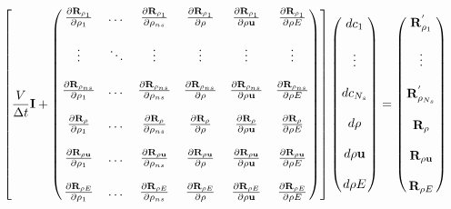 \documentclass[a4paper]{report}
\begin{document}
\begin{equation}
  \left[ 
    \frac{V}{\Delta t} \mi + 
    \begin{pmatrix}
      \tdiff{\rho_1}{\rho_1}    & \dots  & \tdiff{\rho_{ns}}{\rho_1}    & \tdiff{\rho}{\rho_1}    & \tdiff{\rho \vu}{\rho_1}    & \tdiff{\rho E}{\rho_1} \\ \\
      \vdots                    & \ddots & \vdots                       & \vdots                  & \vdots                      & \vdots                   \\ \\
      \tdiff{\rho_1}{\rho_{ns}} & \dots  & \tdiff{\rho_{ns}}{\rho_{ns}} & \tdiff{\rho}{\rho_{ns}} & \tdiff{\rho \vu}{\rho_{ns}} & \tdiff{\rho E}{\rho_{ns}} \\ \\
      \tdiff{\rho_1}{\rho}      & \dots  & \tdiff{\rho_{ns}}{\rho}      & \tdiff{\rho}{\rho}      & \tdiff{\rho \vu}{\rho}      & \tdiff{\rho E}{\rho}      \\ \\
      \tdiff{\rho_1}{\rho \vu}  & \dots  & \tdiff{\rho_{ns}}{\rho \vu}  & \tdiff{\rho}{\rho \vu}  & \tdiff{\rho \vu}{\rho \vu}  & \tdiff{\rho E}{\rho \vu} \\ \\
      \tdiff{\rho_1}{\rho E}    & \dots  & \tdiff{\rho_{ns}}{\rho E}    & \tdiff{\rho}{\rho E}    & \tdiff{\rho \vu}{\rho E}    & \tdiff{\rho E}{\rho E}
    \end{pmatrix}
  \right]
  \begin{pmatrix}
    d c_1      \\ \\
    \vdots     \\ \\
    d c_{N_s}  \\ \\
    d \rho     \\ \\
    d \rho \vu \\ \\
    d \rho E
  \end{pmatrix}
  =
  \begin{pmatrix}
    \res{\rho_1}^{'}     \\ \\
    \vdots               \\ \\
    \res{\rho_{N_s}}^{'} \\ \\
    \res{\rho}           \\ \\
    \res{\rho \vu}       \\ \\
    \res{\rho E}
  \end{pmatrix}
  \label{dc-flow}
\end{equation}
\end{document}
